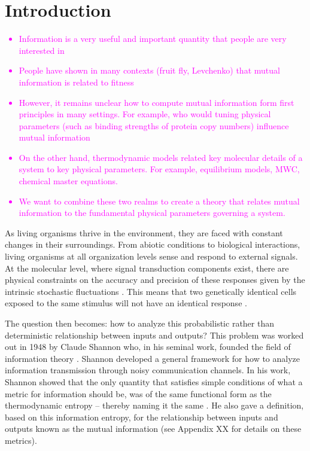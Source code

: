 \section{Introduction}

\textcolor{magenta}{
\begin{itemize}
	\item Information is a very useful and important quantity that people are very interested in
	\item People have shown in many contexts (fruit fly, Levchenko) that mutual information is related to fitness
	\item However, it remains unclear how to compute mutual information form first principles in many settings. For example, who would tuning physical parameters (such as binding strengths of protein copy numbers) influence mutual information
	\item On the other hand, thermodynamic models related key molecular details of a system to key physical parameters. For example, equilibrium models, MWC, chemical master equations.
	\item We want to combine these two realms to create a theory that relates mutual information to the fundamental physical parameters governing a system.
\end{itemize}
}

As living organisms thrive in the environment, they are faced with constant
changes in their surroundings. From abiotic conditions to biological
interactions, living organisms at all organization levels sense and respond to
external signals. At the molecular level, where signal transduction components
exist, there are physical constraints on the accuracy and precision of these
responses given by the intrinsic stochastic fluctuations  \cite{Nemenman2010}.
This means that two genetically identical cells exposed to the same stimulus
will not have an identical response \cite{Eldar2010}.

The question then becomes: how to analyze this probabilistic rather than
deterministic relationship between inputs and outputs? This problem was worked
out in 1948 by Claude Shannon who, in his seminal work, founded the field of
information theory \cite{Shannon1948}. Shannon developed a general framework for
how to analyze information transmission through noisy communication channels. In
his work, Shannon showed that the only quantity that satisfies simple
conditions of what a metric for information should be, was of the same
functional form as the thermodynamic entropy -- thereby naming it the same
\cite{MacKay2003}. He also gave a definition, based on this information entropy,
for the relationship between inputs and outputs known as the mutual information
(see Appendix XX for details on these metrics). 

